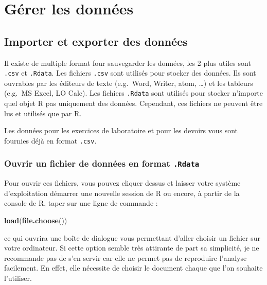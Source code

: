 \documentclass[12pt,]{book}
\newenvironment{Shaded}{\begin{snugshade}}{\end{snugshade}}
\newcommand{\KeywordTok}[1]{\textcolor[rgb]{0.27,0.27,0.27}{\textbf{#1}}}
\newcommand{\NormalTok}[1]{#1}
\begin{document}
\fi

\hypertarget{guxe9rer-les-donnuxe9es}{%
\section{Gérer les données}\label{guxe9rer-les-donnuxe9es}}

\hypertarget{importer-et-exporter-des-donnuxe9es}{%
\subsection{Importer et exporter des données}\label{importer-et-exporter-des-donnuxe9es}}

Il existe de multiple format four sauvegarder les données, les 2 plus utiles sont \texttt{.csv} et \texttt{.Rdata}.
Les fichiers \texttt{.csv} sont utilisés pour stocker des données.
Ils sont ouvrables par les éditeurs de texte (e.g.~Word, Writer, atom, \ldots{}) et les tableurs (e.g.~MS Excel, LO Calc).
Les fichiers \texttt{.Rdata} sont utilisés pour stocker n'importe quel objet R pas uniquement des données.
Cependant, ces fichiers ne peuvent être lus et utilisés que par R.

Les données pour les exercices de laboratoire et pour les devoirs vous sont fournies déjà en format \texttt{.csv}.

\hypertarget{ouvrir-un-fichier-de-donnuxe9es-en-format-.rdata}{%
\subsubsection{\texorpdfstring{Ouvrir un fichier de données en format \texttt{.Rdata}}{Ouvrir un fichier de données en format .Rdata}}\label{ouvrir-un-fichier-de-donnuxe9es-en-format-.rdata}}

Pour ouvrir ces fichiers, vous pouvez cliquer dessus et laisser votre système d'exploitation démarrer une nouvelle session de R ou encore, à partir de la console de R, taper sur une ligne de commande :

\begin{Shaded}
\begin{Highlighting}[]
\KeywordTok{load}\NormalTok{(}\KeywordTok{file.choose}\NormalTok{())}
\end{Highlighting}
\end{Shaded}

ce qui ouvrira une boîte de dialogue vous permettant d'aller choisir un fichier sur votre ordinateur.
Si cette option semble très attirante de part sa simplicité, je ne recommande pas de s'en servir car elle ne permet pas de reproduire l'analyse facilement. En effet, elle nécessite de choisir le document chaque que l'on souhaite l'utiliser.
\end{document}
